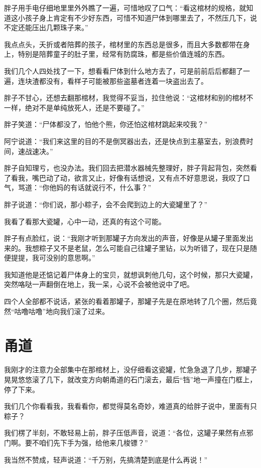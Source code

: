 胖子用手电仔细地里里外外瞧了一遍，可惜地叹了口气：“看这棺材的规格，就知道这小孩子身上肯定有不少好东西，可惜不知道尸体到哪里去了，不然压几下，说不定还能压出几颗珠子来。”

我点点头，夭折或者陪葬的孩子，棺材里的东西总是很多，而且大多数都带在身上，特别是陪葬童子的肚子里，经常有防腐珠，都是些价值连城的东西。

我们几个人四处找了一下，想看看尸体到什么地方去了，可是前前后后都翻了一遍，连块渣都没有，看样子可能被那些盗墓者连着一块盗出去了。

胖子不甘心，还想去翻那棺材，我觉得不妥当，拉住他说：“这棺材和别的棺材不一样，绝对不是单纯放死人，还是不要碰了。”

胖子笑道：“尸体都没了，怕他个熊，你还怕这棺材跳起来咬我？”

阿宁说道：“我们来这里的目的不是倒冥器出去，还是快点到主墓室去，别浪费时间，速战速决。”

胖子自知理亏，也没办法。我们回去把潜水器械先整理好，胖子背起背包，突然看了看我，嘴巴动了动，欲言又止，好像有话想说，又有点不好意思说，我叹了口气，骂道：“你他妈的有话就说行不，什么事？”

胖子说道：“你们说，那小粽子，会不会爬到边上的大瓷罐里了？”

我看了看那大瓷罐，心中一动，还真的有这个可能。

胖子有点脸红，说：“我刚才听到那罐子方向发出的声音，好像是从罐子里面发出来的。我想粽子又不是老鼠，怎么可能自己往罐子里钻，以为听错了，现在只是随便提提，我可没别的意思啊。”

我知道他是还惦记着尸体身上的宝贝，就想讽刺他几句，这个时候，那只大瓷罐，突然咯哒一声翻倒在地上，我一呆，心说不会被他说中了吧。

四个人全部都不说话，紧张的看着那罐子，那罐子先是在原地转了几个圈，然后竟然“咕噜咕噜”地向我们滚了过来。

\chapter{甬道}

我刚才的注意力全部集中在那棺材上，没仔细看这瓷罐，忙急急退了几步，那罐子晃晃悠悠滚了几下，就改变方向朝甬道的石门滚去，最后“铛”地一声撞在门框上，停了下来。

我们几个你看看我，我看看你，都觉得莫名奇妙，难道真的给胖子说中，里面有只粽子？

我们楞了半刻，不敢轻易上前，胖子压低声音，说道：“各位，这罐子果然有点邪门啊。要不咱们先下手为强，给他来几梭镖？”

我当然不赞成，轻声说道：“千万别，先搞清楚到底是什么再说！”

